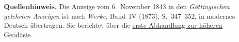 \par\medskip\begin{small}\noindent\textbf{Quellenhinweis.} Die Anzeige vom 6.~November 1843 in den \textit{Göttingischen gelehrten Anzeigen} ist nach \textit{Werke}, Band~IV (1873), S.~347--352, in modernes Deutsch übertragen. Sie berichtet über die \hyperlink{geodaesie1.0}{erste Abhandlung zur höheren Geodäsie}.\par\end{small}
